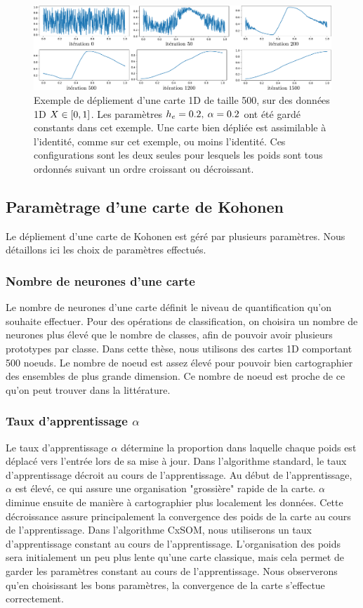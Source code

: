 \begin{figure}
\centering
\includegraphics[width=\textwidth]{depliement_1D.pdf}
\caption{Exemple de dépliement d'une carte 1D de taille 500, sur des données 1D $X \in [0,1]$. Les paramètres $h_{e} = 0.2, \: \alpha = 0.2$ ont été gardé constants dans cet exemple. Une carte bien dépliée est assimilable à l'identité, comme sur cet exemple, ou moins l'identité. Ces configurations sont les deux seules pour lesquels les poids sont tous ordonnés suivant un ordre croissant ou décroissant.}
\label{fig:depliement}
\end{figure}

\subsection{Paramètrage d'une carte de Kohonen}
Le dépliement d'une carte de Kohonen est géré par plusieurs paramètres. Nous détaillons ici les choix de paramètres effectués. 
\subsubsection{Nombre de neurones d'une carte}
Le nombre de neurones d'une carte définit le niveau de quantification qu'on souhaite effectuer. Pour des opérations de classification, on choisira un nombre de neurones plus élevé que le nombre de classes, afin de pouvoir avoir plusieurs prototypes par classe.
Dans cette thèse, nous utilisons des cartes 1D comportant 500 noeuds. Le nombre de noeud est assez élevé pour pouvoir bien cartographier des ensembles de plus grande dimension. Ce nombre de noeud est proche de ce qu'on peut trouver dans la littérature. 

\subsubsection{Taux d'apprentissage $\alpha$}

Le taux d'apprentissage $\alpha$ détermine la proportion dans laquelle chaque poids est déplacé vers l'entrée lors de sa mise à jour. Dans l'algorithme standard, le taux d'apprentissage décroit au cours de l'apprentissage. Au début de l'apprentissage, $\alpha$ est élevé, ce qui assure une organisation "grossière" rapide de la carte. $\alpha$ diminue ensuite de manière à cartographier plus localement les données. Cette décroissance assure principalement la convergence des poids de la carte au cours de l'apprentissage.
Dans l'algorithme CxSOM, nous utiliserons un taux d'apprentissage constant au cours de l'apprentissage. L'organisation des poids sera initialement un peu plus lente qu'une carte classique, mais cela permet de garder les paramètres constant au cours de l'apprentissage.
Nous observerons qu'en choisissant les bons paramètres, la convergence de la carte s'effectue correctement.
